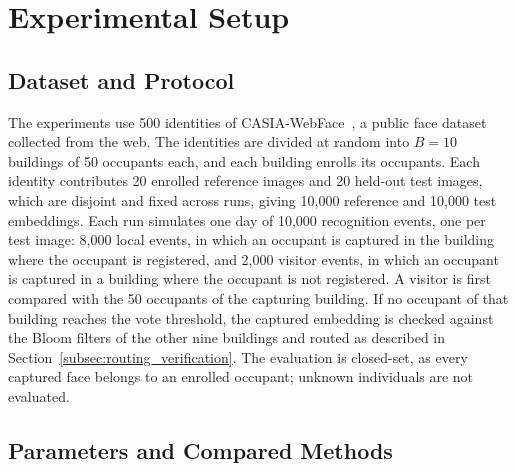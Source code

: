 \documentclass[pdflatex,sn-mathphys-num]{sn-jnl}%
\theoremstyle{thmstyleone}%
\theoremstyle{thmstyletwo}%
\theoremstyle{thmstylethree}%
\begin{document}

\section{Experimental Setup}
\label{sec:setup}

\subsection{Dataset and Protocol}

The experiments use 500 identities of CASIA-WebFace~\cite{yi2014}, a public face dataset collected from the web. The identities are divided at random into $B=10$ buildings of 50 occupants each, and each building enrolls its occupants. Each identity contributes 20 enrolled reference images and 20 held-out test images, which are disjoint and fixed across runs, giving 10,000 reference and 10,000 test embeddings. Each run simulates one day of 10,000 recognition events, one per test image: 8,000 local events, in which an occupant is captured in the building where the occupant is registered, and 2,000 visitor events, in which an occupant is captured in a building where the occupant is not registered. A visitor is first compared with the 50 occupants of the capturing building. If no occupant of that building reaches the vote threshold, the captured embedding is checked against the Bloom filters of the other nine buildings and routed as described in Section~\ref{subsec:routing_verification}. The evaluation is closed-set, as every captured face belongs to an enrolled occupant; unknown individuals are not evaluated.

\subsection{Parameters and Compared Methods}
\end{document}
